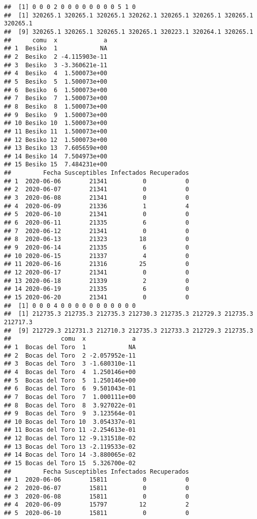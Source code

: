 \documentclass[
]{article}
\begin{document}
\begin{verbatim}
##  [1] 0 0 0 2 0 0 0 0 0 0 0 0 5 1 0
##  [1] 320265.1 320265.1 320265.1 320262.1 320265.1 320265.1 320265.1 320265.1
##  [9] 320265.1 320265.1 320265.1 320265.1 320223.1 320264.1 320265.1
##      comu  x             a
## 1  Besiko  1            NA
## 2  Besiko  2 -4.115903e-11
## 3  Besiko  3 -3.360621e-11
## 4  Besiko  4  1.500073e+00
## 5  Besiko  5  1.500073e+00
## 6  Besiko  6  1.500073e+00
## 7  Besiko  7  1.500073e+00
## 8  Besiko  8  1.500073e+00
## 9  Besiko  9  1.500073e+00
## 10 Besiko 10  1.500073e+00
## 11 Besiko 11  1.500073e+00
## 12 Besiko 12  1.500073e+00
## 13 Besiko 13  7.605659e+00
## 14 Besiko 14  7.504973e+00
## 15 Besiko 15  7.484231e+00
##         Fecha Susceptibles Infectados Recuperados
## 1  2020-06-06        21341          0           0
## 2  2020-06-07        21341          0           0
## 3  2020-06-08        21341          0           0
## 4  2020-06-09        21336          1           4
## 5  2020-06-10        21341          0           0
## 6  2020-06-11        21335          6           0
## 7  2020-06-12        21341          0           0
## 8  2020-06-13        21323         18           0
## 9  2020-06-14        21335          6           0
## 10 2020-06-15        21337          4           0
## 11 2020-06-16        21316         25           0
## 12 2020-06-17        21341          0           0
## 13 2020-06-18        21339          2           0
## 14 2020-06-19        21335          6           0
## 15 2020-06-20        21341          0           0
##  [1] 0 0 0 4 0 0 0 0 0 0 0 0 0 0 0
##  [1] 212735.3 212735.3 212735.3 212730.3 212735.3 212729.3 212735.3 212717.3
##  [9] 212729.3 212731.3 212710.3 212735.3 212733.3 212729.3 212735.3
##              comu  x             a
## 1  Bocas del Toro  1            NA
## 2  Bocas del Toro  2 -2.057952e-11
## 3  Bocas del Toro  3 -1.680310e-11
## 4  Bocas del Toro  4  1.250146e+00
## 5  Bocas del Toro  5  1.250146e+00
## 6  Bocas del Toro  6  9.501043e-01
## 7  Bocas del Toro  7  1.000111e+00
## 8  Bocas del Toro  8  3.927022e-01
## 9  Bocas del Toro  9  3.123564e-01
## 10 Bocas del Toro 10  3.054337e-01
## 11 Bocas del Toro 11 -2.254613e-01
## 12 Bocas del Toro 12 -9.131518e-02
## 13 Bocas del Toro 13 -2.119533e-02
## 14 Bocas del Toro 14 -3.880065e-02
## 15 Bocas del Toro 15  5.326700e-02
##         Fecha Susceptibles Infectados Recuperados
## 1  2020-06-06        15811          0           0
## 2  2020-06-07        15811          0           0
## 3  2020-06-08        15811          0           0
## 4  2020-06-09        15797         12           2
## 5  2020-06-10        15811          0           0

\end{verbatim}
\end{document}
